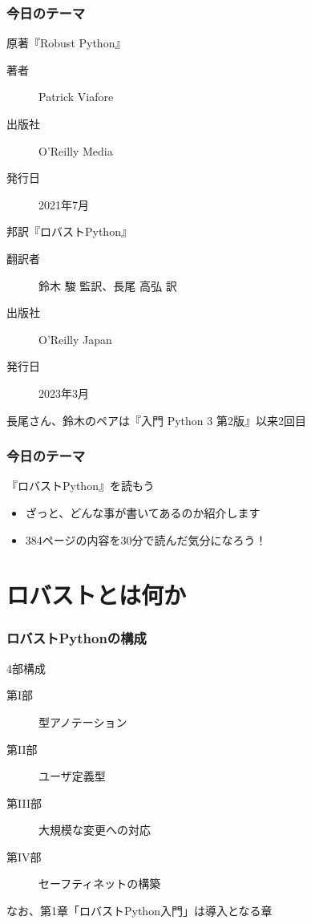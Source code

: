 \documentclass[aspectratio=169,dvipdfmx,12pt,notheorems]{beamer}
\theoremstyle{definition}
\begin{document}
\begin{frame}\frametitle{今日のテーマ}

\begin{block}{原著『Robust Python』}
\begin{description}
\item[著者] Patrick Viafore
\item[出版社] O'Reilly Media
\item[発行日] 2021年7月
\end{description}
\end{block}

\begin{block}{邦訳『ロバストPython』}
\begin{description}
\item[翻訳者] 鈴木 駿 監訳、長尾 高弘 訳
\item[出版社] O'Reilly Japan
\item[発行日] 2023年3月
\end{description}
\end{block}
長尾さん、鈴木のペアは『入門 Python 3 第2版』以来2回目
\end{frame}

\begin{frame}\frametitle{今日のテーマ}

\begin{block}{『ロバストPython』を読もう}
\begin{itemize}
\item ざっと、どんな事が書いてあるのか紹介します
\item 384ページの内容を30分で読んだ気分になろう！
\end{itemize}
\end{block}
\end{frame}

\section{ロバストとは何か}

\begin{frame}\frametitle{ロバストPythonの構成}
\begin{block}{4部構成}
\begin{description}
\item[第I部] 型アノテーション
\item[第II部] ユーザ定義型
\item[第III部] 大規模な変更への対応
\item[第IV部] セーフティネットの構築
\end{description}
\end{block}
なお、第1章「ロバストPython入門」は導入となる章
\end{frame}
\end{document}
